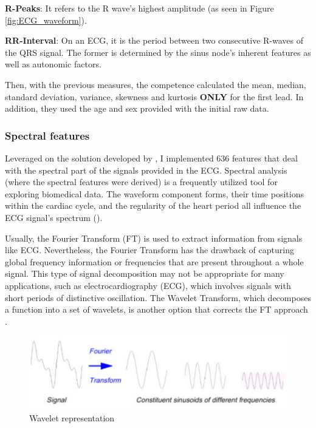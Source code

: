 \textbf{R-Peaks}: It refers to the R wave's highest amplitude (as seen in Figure \ref{fig:ECG_waveform}).

\textbf{RR-Interval}: On an ECG, it is the period between two consecutive R-waves of the QRS signal. The former is determined by the sinus node's inherent features as well as autonomic factors.

Then, with the previous measures, the competence calculated the mean, median, standard deviation, variance, skewness and kurtosis \textbf{ONLY} for the first lead. In addition, they used the age and sex provided with the initial raw data.

\subsubsection{Spectral features}

Leveraged on the solution developed by \cite{github_spectralfeatures}, I implemented 636 features that deal with the spectral part of the signals provided in the ECG. Spectral analysis (where the spectral features were derived) is a frequently utilized tool for exploring biomedical data. The waveform component forms, their time positions within the cardiac cycle, and the regularity of the heart period all influence the ECG signal's spectrum (\cite{spectralfeatures}). 

Usually, the Fourier Transform (FT) is used to extract information from signals like ECG. Nevertheless, the Fourier Transform has the drawback of capturing global frequency information or frequencies that are present throughout a whole signal. This type of signal decomposition may not be appropriate for many applications, such as electrocardiography (ECG), which involves signals with short periods of distinctive oscillation. The Wavelet Transform, which decomposes a function into a set of wavelets, is another option that corrects the FT approach \cite{spectral_features}.

\begin{figure}[H]
\centering
\includegraphics[scale=0.4]{img/wavelet.PNG}
\caption{Wavelet representation}
\label{fig:wavelet}
\end{figure}

